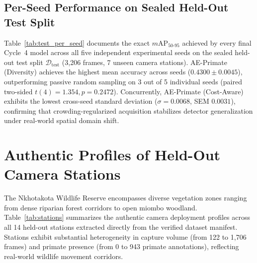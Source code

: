 \documentclass[conference]{IEEEtran}
\begin{document}
\subsection{Per-Seed Performance on Sealed Held-Out Test Split}
Table~\ref{tab:test_per_seed} documents the exact $m\text{AP}_{50\text{-}95}$ achieved by every final Cycle~4 model across all five independent experimental seeds on the sealed held-out test split $\mathcal{D}_\text{test}$ (3,206 frames, 7 unseen camera stations). AE-Primate (Diversity) achieves the highest mean accuracy across seeds ($0.4300 \pm 0.0045$), outperforming passive random sampling on 3 out of 5 individual seeds (paired two-sided $t(4) = 1.354, p = 0.2472$). Concurrently, AE-Primate (Cost-Aware) exhibits the lowest cross-seed standard deviation ($\sigma = 0.0068$, SEM $0.0031$), confirming that crowding-regularized acquisition stabilizes detector generalization under real-world spatial domain shift.

\begin{table}[h]
\centering
\renewcommand{\arraystretch}{0.82}
\caption{Cycle~4 Generalization on Sealed Test Split $\mathcal{D}_\text{test}$ (3,206 frames) Across All Five Independent Seeds.}
\label{tab:test_per_seed}
\end{table}

\section{Authentic Profiles of Held-Out Camera Stations}
\label{app:stations}

The Nkhotakota Wildlife Reserve encompasses diverse vegetation zones ranging from dense riparian forest corridors to open miombo woodland. Table~\ref{tab:stations} summarizes the authentic camera deployment profiles across all 14 held-out stations extracted directly from the verified dataset manifest. Stations exhibit substantial heterogeneity in capture volume (from 122 to 1,706 frames) and primate presence (from 0 to 943 primate annotations), reflecting real-world wildlife movement corridors.
\end{document}
